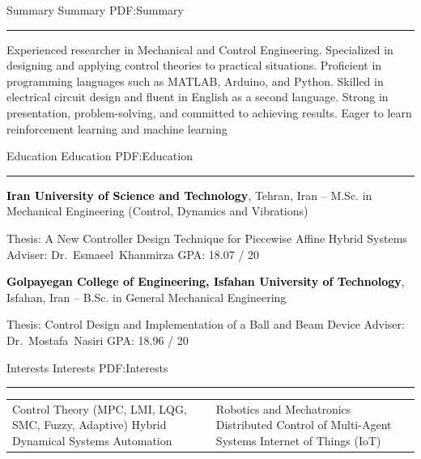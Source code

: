 \documentclass[letterpaper,MMMyyyy]{CVTemplate}
\begin{document}
\begin{Body}

\Section
{Summary}
{Summary}
{PDF:Summary}
\textcolor{Forestg}{\vspace{0.10cm}\hrule height 0.1cm}\BigGap\Gap
\Entry
\BulletItem Experienced researcher in Mechanical and Control Engineering.
\BulletItem Specialized in designing and applying control theories to practical situations.
\BulletItem Proficient in programming languages such as MATLAB, Arduino, and Python.
\BulletItem Skilled in electrical circuit design and fluent in English as a second language.
\BulletItem Strong in presentation, problem-solving, and committed to achieving results.
\BulletItem Eager to learn reinforcement learning and machine learning

\Section
{Education}
{Education}
{PDF:Education}
\textcolor{Forestg}{\vspace{0.10cm}\hrule height 0.1cm}\BigGap\Gap
\Entry
{\textcolor{black}{\textbf{Iran University of Science and Technology}}, Tehran, Iran}
\hfill
{\textcolor{OrangeY}{ --
	}}
\Gap
\BulletItem
M.Sc. in
{Mechanical Engineering \small{(Control, Dynamics and Vibrations)}}

\begin{Detail}
\SubBulletItem
Thesis:
{A New Controller Design Technique for Piecewise Affine Hybrid Systems}
\SubBulletItem
Adviser:
Dr.~Esmaeel~Khanmirza
\SubBulletItem
GPA: 18.07 / 20
\end{Detail}


\BigGap
\Entry
{\textcolor{black}{\textbf{Golpayegan College of Engineering, Isfahan University of Technology}},
Isfahan, Iran}
\hfill
\textcolor{OrangeY}{ --
}
\Gap
\BulletItem
B.Sc. in
{General Mechanical Engineering}

\begin{Detail}
\SubBulletItem
Thesis: Control Design and Implementation of a Ball and Beam Device
\SubBulletItem
Adviser:
Dr.~Mostafa~Nasiri
\SubBulletItem
GPA: 18.96 / 20
\end{Detail}



\Section
{Interests}
{Interests}
{PDF:Interests}
\textcolor{Forestg}{\vspace{0.10cm}\hrule height 0.1cm}\BigGap\Gap
\Entry

\begin{center}
	\begin{tabular}{ m{8cm} m{8cm} }
		\BulletItem
		Control Theory
		\scriptsize{(MPC, LMI, LQG, SMC, Fuzzy, Adaptive)}
		\normalsize
		\BulletItem
		Hybrid Dynamical Systems
		\BulletItem
		Automation
		 & \BulletItem
		Robotics and Mechatronics
		\BulletItem
		Distributed Control of Multi-Agent Systems
		\BulletItem
		Internet of Things (IoT)
	\end{tabular}
\end{center}
\vspace{6pt}



\end{Body}
\end{document}

